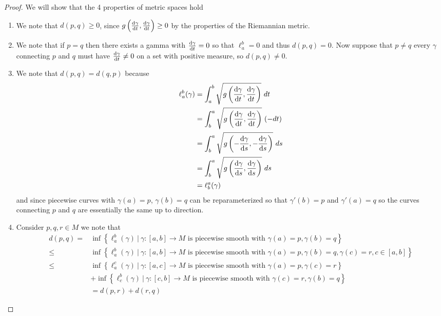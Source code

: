 \documentclass[a4paper]{article}
\begin{document}
\begin{proof}
  We will show that the 4 properties of metric spaces hold
  \begin{enumerate}
    \item We note that $d(p,q) \geq 0$, since $g \left( \dv{\gamma}{t}, \dv{\gamma}{t} \right) \geq 0$ by the properties of the Riemannian metric.
    \item We note  that if $p = q$ then there exists a gamma with $\dv{\gamma}{t} = 0$ so that $\ell^b_a = 0$ and thus $d(p,q) = 0$. Now suppose that $p \neq q$ every $\gamma$ connecting $p$ and $q$ must have $\dv{\gamma}{t} \neq 0$ on a set with positive measure, so $d(p,q) \neq 0$.
    \item We note that $d(p,q) = d(q,p)$ because
      \[
        \begin{aligned} 
          \ell_a^b(\gamma) &= \int_a^b \sqrt{ g \left( \dv{\gamma}{t}, \dv{\gamma}{t} \right)}\ dt\\
                   &= \int_b^a \sqrt{ g \left( \dv{\gamma}{t}, \dv{\gamma}{t} \right)}\ (-dt)\\
                   &= \int_b^a \sqrt{ g \left( -\dv{\gamma}{s}, -\dv{\gamma}{s} \right)}\ ds\\
                   &= \int_b^a \sqrt{ g \left( \dv{\gamma}{s}, \dv{\gamma}{s} \right)}\ ds\\
                   &= \ell_b^a(\gamma)
        \end{aligned}
     \]
     and since piecewise curves with $\gamma(a) = p$, $\gamma(b) = q$ can be reparameterized so that $\gamma'(b)=p$ and $\gamma'(a) = q$ so the curves connecting $p$ and $q$ are essentially the same up to direction.
   \item Consider $p,q,r \in M$ we note that
     \[
       \begin{aligned}
         d(p,q) =& \inf \left\{ \ell_a^b(\gamma)\ |\ \gamma:[a,b] \rightarrow M \text{ is piecewise smooth with } \gamma(a)=p, \gamma(b) = q \right\} \\
         \leq& \inf \left\{ \ell_a^b(\gamma)\ |\ \gamma:[a,b] \rightarrow M \text{ is piecewise smooth with } \gamma(a)=p, \gamma(b) = q, \gamma(c) = r, c \in [a,b] \right\} \\
         \leq& \inf \left\{ \ell_a^c(\gamma)\ |\ \gamma:[a,c] \rightarrow M \text{ is piecewise smooth with } \gamma(a)=p, \gamma(c) = r \right\} \\
                &+\inf \left\{ \ell_c^b(\gamma)\ |\ \gamma:[c,b] \rightarrow M \text{ is piecewise smooth with } \gamma(c)=r, \gamma(b) = q \right\} \\
                &= d(p,r) + d(r,q)
       \end{aligned}
     \]
  \end{enumerate}
\end{proof}
\end{document}
